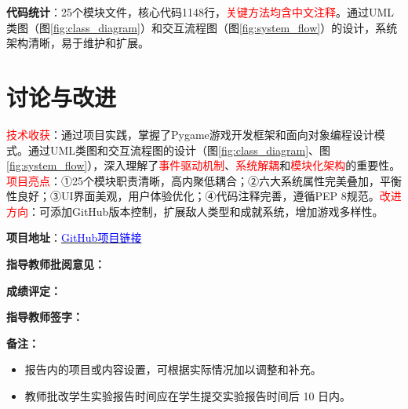 \documentclass[a4paper,12pt]{article}
\begin{document}
\textbf{代码统计}：25个模块文件，核心代码1148行，\textcolor{red}{关键方法均含中文注释}。通过UML类图（图\ref{fig:class_diagram}）和交互流程图（图\ref{fig:system_flow}）的设计，系统架构清晰，易于维护和扩展。

\section{讨论与改进}

\textcolor{red}{技术收获}：通过项目实践，掌握了Pygame游戏开发框架和面向对象编程设计模式。通过UML类图和交互流程图的设计（图\ref{fig:class_diagram}、图\ref{fig:system_flow}），深入理解了\textcolor{red}{事件驱动机制}、\textcolor{red}{系统解耦}和\textcolor{red}{模块化架构}的重要性。\textcolor{red}{项目亮点}：①25个模块职责清晰，高内聚低耦合；②六大系统属性完美叠加，平衡性良好；③UI界面美观，用户体验优化；④代码注释完善，遵循PEP 8规范。\textcolor{red}{改进方向}：可添加GitHub版本控制，扩展敌人类型和成就系统，增加游戏多样性。

\textbf{项目地址}：\href{https://github.com/your-username/alien_invasion}{\textcolor{blue}{GitHub项目链接}}

\newpage



\vspace{1cm}

\noindent \textbf{指导教师批阅意见：}

\vspace{5cm}

\hfill

\vspace{1cm}

\noindent \textbf{成绩评定：}

\vspace{2cm}

\hfill

\vspace{1cm}

\noindent \textbf{指导教师签字：}

\vspace{2cm}

\hfill

\vspace{1cm}

\noindent \textbf{备注：}

\begin{itemize}
    \item 报告内的项目或内容设置，可根据实际情况加以调整和补充。
    \item 教师批改学生实验报告时间应在学生提交实验报告时间后 10 日内。
\end{itemize}

\end{document}
